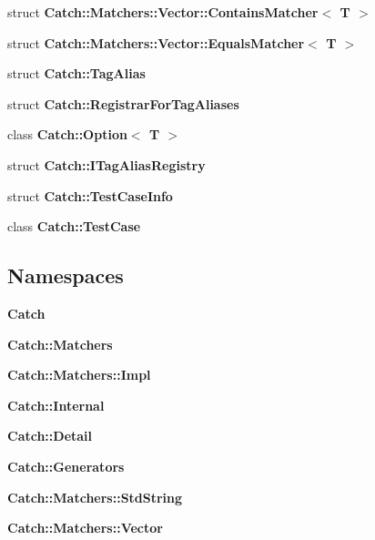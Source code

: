 \begin{DoxyCompactItemize}
\item 
struct \textbf{ Catch\+::\+Matchers\+::\+Vector\+::\+Contains\+Matcher$<$ T $>$}
\item 
struct \textbf{ Catch\+::\+Matchers\+::\+Vector\+::\+Equals\+Matcher$<$ T $>$}
\item 
struct \textbf{ Catch\+::\+Tag\+Alias}
\item 
struct \textbf{ Catch\+::\+Registrar\+For\+Tag\+Aliases}
\item 
class \textbf{ Catch\+::\+Option$<$ T $>$}
\item 
struct \textbf{ Catch\+::\+I\+Tag\+Alias\+Registry}
\item 
struct \textbf{ Catch\+::\+Test\+Case\+Info}
\item 
class \textbf{ Catch\+::\+Test\+Case}
\end{DoxyCompactItemize}
\subsection*{Namespaces}
\begin{DoxyCompactItemize}
\item 
 \textbf{ Catch}
\item 
 \textbf{ Catch\+::\+Matchers}
\item 
 \textbf{ Catch\+::\+Matchers\+::\+Impl}
\item 
 \textbf{ Catch\+::\+Internal}
\item 
 \textbf{ Catch\+::\+Detail}
\item 
 \textbf{ Catch\+::\+Generators}
\item 
 \textbf{ Catch\+::\+Matchers\+::\+Std\+String}
\item 
 \textbf{ Catch\+::\+Matchers\+::\+Vector}
\end{DoxyCompactItemize}
